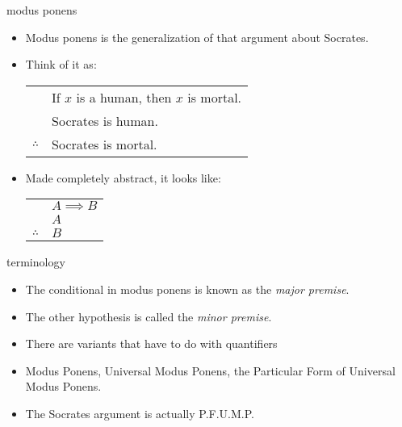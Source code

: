 \documentclass[landscape]{beamer}
\begin{document}
\begin{frame}{modus ponens}
\begin{itemize}
\item Modus ponens is the generalization of that argument about Socrates. \pause
\item Think of it as:

\begin{center}
\begin{tabular}{cl}
 & If $x$ is a human, then $x$ is mortal. \\
 & Socrates is human. \\ \hline
$\therefore$ & Socrates is mortal.\\
\end{tabular}
\end{center}
\pause

\item Made completely abstract, it looks like: \pause

\begin{center}
\begin{tabular}{cl}
 & $A \implies B$ \\
 & $A$ \\ \hline
$\therefore$ & $B$\\
\end{tabular}
\end{center}

\end{itemize}
\end{frame}

\begin{frame}{terminology}
\begin{itemize}
\item The conditional in modus ponens is known as the {\em major premise}. \pause
\item The other hypothesis is called the {\em minor premise}. \pause
\item There are variants that have to do with quantifiers \pause
\item Modus Ponens, \pause Universal Modus Ponens, \pause the Particular Form of Universal Modus Ponens. \pause
\item The Socrates argument is actually P.F.U.M.P.
\end{itemize}
\end{frame}
\end{document}
